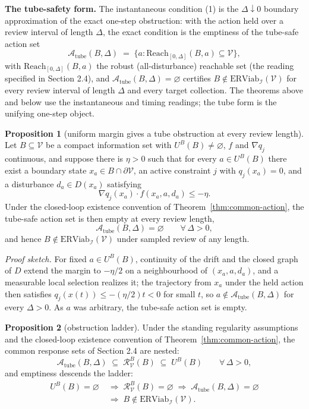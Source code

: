 \documentclass[10pt,twocolumn]{article}
\theoremstyle{definition}
\newtheorem{proposition}{Proposition}
\begin{document}
\textbf{The tube-safety form.} The instantaneous condition (1) is the
\(\Delta \downarrow 0\) boundary approximation of the exact one-step
obstruction: with the action held over a review interval of length
\(\Delta\), the exact condition is the emptiness of the tube-safe action
set
\[\mathcal{A}_{\mathrm{tube}}(B, \Delta) \;=\; \Big\{ a : \mathrm{Reach}_{[0,\Delta]}(B, a) \subseteq \mathcal{V} \Big\},\]
with \(\mathrm{Reach}_{[0,\Delta]}(B, a)\) the robust (all-disturbance) reachable set (the reading specified in Section 2.4),
and \(\mathcal{A}_{\mathrm{tube}}(B, \Delta) = \varnothing\) certifies
\(B \notin \mathrm{ERViab}_{\mathcal{I}}(\mathcal{V})\) for every review
interval of length \(\Delta\) and every target collection. The theorems
above and below use the instantaneous and timing readings; the tube form
is the unifying one-step object.

\begin{proposition}[uniform margin gives a tube obstruction at every review length]\label{prop:uniform-margin}
Let \(B\subseteq\mathcal V\) be a compact information set with
\(U^B(B)\neq\varnothing\), \(f\) and \(\nabla q_j\) continuous, and
suppose there is \(\eta>0\) such that for every \(a\in U^B(B)\) there
exist a boundary state \(x_a\in B\cap\partial\mathcal V\), an active
constraint \(j\) with \(q_j(x_a)=0\), and a disturbance \(d_a\in D(x_a)\)
satisfying
\[\nabla q_j(x_a)\cdot f(x_a,a,d_a) \le -\eta.\]
Under the closed-loop existence convention of
Theorem~\ref{thm:common-action}, the tube-safe action set is then empty
at every review length,
\[\mathcal{A}_{\mathrm{tube}}(B,\Delta)=\varnothing \qquad \forall\,\Delta>0,\]
and hence \(B\notin\mathrm{ERViab}_{\mathcal I}(\mathcal V)\) under
sampled review of any length.
\end{proposition}

\emph{Proof sketch.} For fixed \(a \in U^B(B)\), continuity of the drift and the closed graph of \(D\) extend the margin to \(-\eta/2\) on a neighbourhood of \((x_a, a, d_a)\), and a measurable local selection realizes it; the trajectory from \(x_a\) under the held action then satisfies \(q_j(x(t)) \le -(\eta/2) t < 0\) for small \(t\), so \(a \notin \mathcal{A}_{\mathrm{tube}}(B, \Delta)\) for every \(\Delta > 0\). As \(a\) was arbitrary, the tube-safe action set is empty.

\begin{proposition}[obstruction ladder]\label{prop:ladder}
Under the standing regularity assumptions and the closed-loop existence
convention of Theorem~\ref{thm:common-action}, the common response sets
of Section 2.4 are nested:
\[\mathcal{A}_{\mathrm{tube}}(B,\Delta) \;\subseteq\; \mathcal{R}_{\mathcal{V}}^B(B) \;\subseteq\; U^B(B) \qquad \forall\,\Delta>0,\]
and emptiness descends the ladder:
\[
\begin{aligned}
U^B(B)=\varnothing \;&\Longrightarrow\; \mathcal{R}_{\mathcal{V}}^B(B)=\varnothing \;\Longrightarrow\; \mathcal{A}_{\mathrm{tube}}(B,\Delta)=\varnothing \\
&\Longrightarrow\; B\notin\mathrm{ERViab}_{\mathcal{I}}(\mathcal{V}).
\end{aligned}
\]
\end{proposition}
\end{document}
